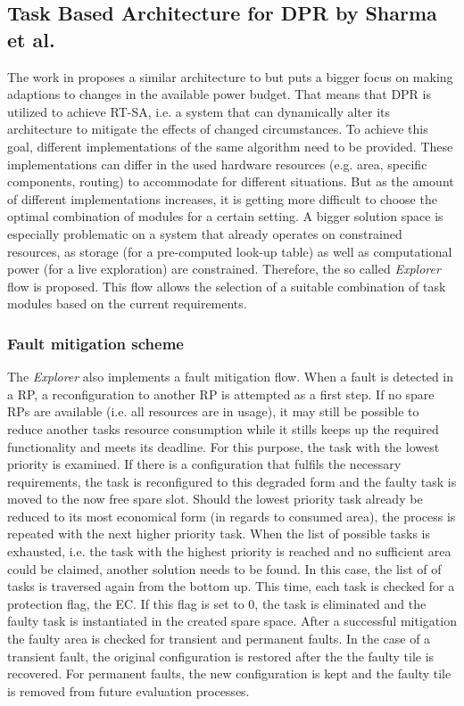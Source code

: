 \subsection{Task Based Architecture for \gls{DPR} by Sharma et al.}\label{TaskBasedArchitectureSharma}
The work in \cite{sharma_run-time_2018} proposes a similar architecture to \cite{wang_dynamic_2018} but puts a bigger focus on making adaptions to changes in the available power budget.
That means that \gls{DPR} is utilized to achieve \gls{RT-SA}, i.e. a system that can dynamically alter its architecture to mitigate the effects of changed circumstances.
To achieve this goal, different implementations of the same algorithm need to be provided.
These implementations can differ in the used hardware resources (e.g. area, specific components, routing) to accommodate for different situations.
But as the amount of different implementations increases, it is getting more difficult to choose the optimal combination of modules for a certain setting.
A bigger solution space is especially problematic on a system that already operates on constrained resources, as storage (for a pre-computed look-up table) as well as computational power (for a live exploration) are constrained. 
Therefore, the so called \textit{Explorer} flow is proposed.
This flow allows the selection of a suitable combination of task modules based on the current requirements.
\subsubsection{Fault mitigation scheme}
The \textit{Explorer} also implements a fault mitigation flow.
When a fault is detected in a \gls{RP}, a reconfiguration to another \gls{RP} is attempted as a first step.
If no spare \glspl{RP} are available (i.e. all resources are in usage), it may still be possible to reduce another tasks resource consumption while it stills keeps up the required functionality and meets its deadline.
For this purpose, the task with the lowest priority is examined.
If there is a configuration that fulfils the necessary requirements, the task is reconfigured to this degraded form and the faulty task is moved to the now free spare slot.
Should the lowest priority task already be reduced to its most economical form (in regards to consumed area), the process is repeated with the next higher priority task. 
When the list of possible tasks is exhausted, i.e. the task with the highest priority is reached and no sufficient area could be claimed, another solution needs to be found. 
In this case, the list of of tasks is traversed again from the bottom up. 
This time, each task is checked for a protection flag, the \gls{EC}. 
If this flag is set to 0, the task is eliminated and the faulty task is instantiated in the created spare space.
After a successful mitigation the faulty area is checked for transient and permanent faults. 
In the case of a transient fault, the original configuration is restored after the the faulty tile is recovered. 
For permanent faults, the new configuration is kept and the faulty tile is removed from future evaluation processes. 
 
